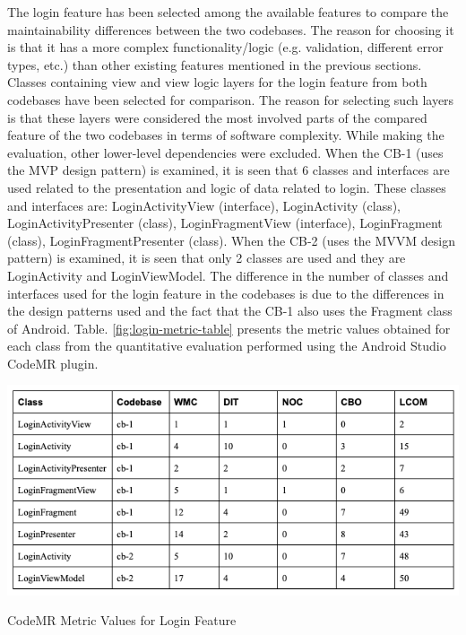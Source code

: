 The login feature has been selected among the available features to compare the maintainability differences between the two codebases. The reason for choosing it is that it has a more complex functionality/logic (e.g. validation, different error types, etc.) than other existing features mentioned in the previous sections. Classes containing view and view logic layers for the login feature from both codebases have been selected for comparison. The reason for selecting such layers is that these layers were considered the most involved parts of the compared feature of the two codebases in terms of software complexity. While making the evaluation, other lower-level dependencies were excluded. When the CB-1 (uses the MVP design pattern) is examined, it is seen that 6 classes and interfaces are used related to the presentation and logic of data related to login. These classes and interfaces are: LoginActivityView (interface), LoginActivity (class), LoginActivityPresenter (class), LoginFragmentView (interface), LoginFragment (class), LoginFragmentPresenter (class). When the CB-2 (uses the MVVM design pattern) is examined, it is seen that only 2 classes are used and they are LoginActivity and LoginViewModel. The difference in the number of classes and interfaces used for the login feature in the codebases is due to the differences in the design patterns used and the fact that the CB-1 also uses the Fragment class of Android. Table. \ref{fig:login-metric-table} presents the metric values obtained for each class from the quantitative evaluation performed using the Android Studio CodeMR plugin.
\begin{table}[htb]
    \centering
    \includegraphics[scale=0.5]{figures/login-metric-table.png}
    \caption{CodeMR Metric Values for Login Feature} 
    \label{fig:login-metric-table}
\end{table}

